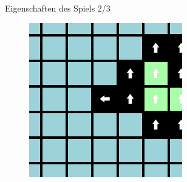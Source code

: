 \documentclass[aspectratio=169]{beamer}
\begin{document}
\begin{frame}{Eigenschaften des Spiels 2/3}
\begin{multicols*}{3}
      \begin{figure}[H]
        \centering
        \includegraphics[width = 0.39 \textheight]{example1_3.png}
      \end{figure}

    \end{multicols*}

  \end{frame}
\end{document}
